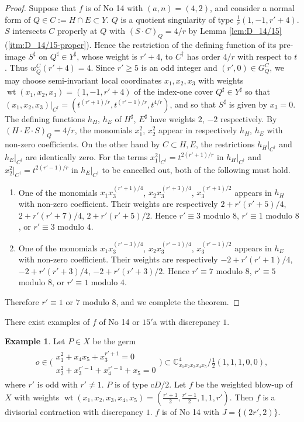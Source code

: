 \documentclass[a4paper,11pt]{amsart}
\theoremstyle{definition}
\newtheorem{example}[theorem]{Example}
\theoremstyle{remark}
\numberwithin{equation}{section}
\newcommand{\bC}{{\mathbb C}}
\newcommand{\wt}{\operatorname{wt}}
\begin{document}
\begin{proof}
Suppose that $f$ is of No 14 with $(a,n)=(4,2)$,
and consider a normal form of $Q \in C:=H \cap E \subset Y$.
$Q$ is a quotient singularity of type $\frac{1}{r}(1,-1,r'+4)$.
$S$ intersects $C$ properly at $Q$ with $(S \cdot C)_Q=4/r$
by Lemma \ref{lem:D_14/15}(\ref{itm:D_14/15-proper}).
Hence the restriction of the defining function of its pre-image $S^\sharp$
on $Q^\sharp \in Y^\sharp$,
whose weight is $r'+4$,
to $C^\dag$ has order $4/r$ with respect to $t$.
Thus $w_Q^C(r'+4)=4$.
Since $r'\ge5$ is an odd integer and $(r',0)\in G_Q^C$,
we may choose semi-invariant local coordinates
$x_1,x_2,x_3$ with weights $\wt(x_1,x_2,x_3)=(1,-1,r'+4)$
of the index-one cover $Q^\sharp \in Y^\sharp$ so that
$(x_1,x_2,x_3) |_{C^\dag}=(t^{(r'+1)/r},t^{(r'-1)/r},t^{4/r})$,
and so that $S^\sharp$ is given by $x_3=0$.
The defining functions $h_H$, $h_E$ of $H^\sharp$, $E^\sharp$ have
weights $2$, $-2$ respectively.
By $(H \cdot E \cdot S)_Q=4/r$,
the monomials $x_1^2$, $x_2^2$ appear in respectively $h_H$, $h_E$
with non-zero coefficients.
On the other hand by $C \subset H,E$,
the restrictions $h_H|_{C^\dag}$ and $h_E|_{C^\dag}$ are identically zero.
For the terms $x_1^2|_{C^\dag}=t^{2(r'+1)/r}$ in $h_H|_{C^\dag}$
and $x_2^2|_{C^\dag}=t^{2(r'-1)/r}$ in $h_E|_{C^\dag}$ to be cancelled out,
both of the following must hold.
\begin{enumerate}
\item
One of the monomials
$x_1x_3^{(r'+1)/4}$, $x_2x_3^{(r'+3)/4}$, $x_3^{(r'+1)/2}$ appears in $h_H$
with non-zero coefficient.
Their weights are respectively $2+r'(r'+5)/4$, $2+r'(r'+7)/4$, $2+r'(r'+5)/2$.
Hence $r'\equiv3$ modulo $8$, $r'\equiv1$ modulo $8$,
or $r'\equiv3$ modulo $4$.
\item
One of the monomials
$x_1x_3^{(r'-3)/4}$, $x_2x_3^{(r'-1)/4}$, $x_3^{(r'-1)/2}$ appears in $h_E$
with non-zero coefficient.
Their weights are respectively
$-2+r'(r'+1)/4$, $-2+r'(r'+3)/4$, $-2+r'(r'+3)/2$.
Hence $r'\equiv7$ modulo $8$, $r'\equiv5$ modulo $8$,
or $r'\equiv1$ modulo $4$.
\end{enumerate}
Therefore $r'\equiv1$ or $7$ modulo $8$,
and we complete the theorem.
\end{proof}

There exist examples of $f$ of No 14 or $\textrm{15}'$a with discrepancy $1$.

\begin{example}\label{exl:cD/2_14-1}
Let $P \in X$ be the germ
\begin{align*}
o \in \bigg(
\begin{array}{c}
x_1^2+x_4x_5+x_3^{r'+1}=0 \\
x_2^2+x_3^{r'-1}+x_4^{r'-1}+x_5=0
\end{array}
\bigg)
\subset \bC^4_{x_1x_2x_3x_4x_5} /\frac{1}{2}(1,1,1,0,0),
\end{align*}
where $r'$ is odd with $r'\neq1$.
$P$ is of type c$D/2$.
Let $f$ be the weighted blow-up of $X$
with weights $\wt(x_1,x_2,x_3,x_4,x_5)=(\frac{r'+1}{2},\frac{r'-1}{2},1,1,r')$.
Then $f$ is a divisorial contraction with discrepancy $1$.
$f$ is of No 14 with $J=\{(2r',2)\}$.
\end{example}
\end{document}

